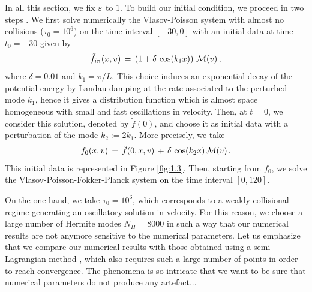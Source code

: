 \documentclass[11pt]{amsart}
\numberwithin{equation}{section}
\numberwithin{figure}{section}
\begin{document}
In all this section, we fix $\varepsilon$ to $1$. To build our initial
condition, we proceed in two steps \cite{filbetCPC}. We first solve numerically the Vlasov-Poisson system with almost no collisions ($\tau_0=10^6$) on the time interval $[-30, 0]$ with an initial data at time $t_0=-30$ given by
$$
\tilde f_{in}(x,v) \,=\, \left(1+\delta \, \cos(k_1 x)\right)\, {\mathcal M}(v)\,,
$$ 
where $\delta =0.01$ and $k_1=\pi/L$. This choice induces an
exponential decay of the potential
energy by Landau damping at the rate associated to the perturbed mode $k_1$, hence
it gives a distribution function  which is almost space homogeneous
with small and fast oscillations in  velocity. Then, at $t=0$, we consider
this solution, denoted by $\tilde f(0)$, and choose it as initial data
with  a  perturbation of the mode $k_2:=2k_1$. More precisely, we take
$$
f_0(x,v) \,=\,  \tilde f(0,x,v) \,+\,\delta \, \cos(k_2 x)\, {\mathcal M}(v) \,.
$$
This initial data is represented in Figure \ref{fig:1.3}. Then, starting from $f_0$, we solve the
Vlasov-Poisson-Fokker-Planck system on the time interval $[0,120]$.



On the one hand, we take $\tau_0=10^{6}$, which corresponds to a
weakly collisional regime generating an oscillatory solution in
velocity. For this reason, we choose a large number of Hermite modes $N_H=8000$ in such a way that our
numerical results are not anymore  sensitive to the numerical parameters. Let
us emphasize that we compare our numerical results with those
obtained using a semi-Lagrangian method
\cite{filbetCPC,sonnen,Filbet2001}, which also requires such a large
number of points in order to reach convergence. The phenomena is so intricate that we want to be sure that numerical parameters do not
produce any artefact...
\end{document}
